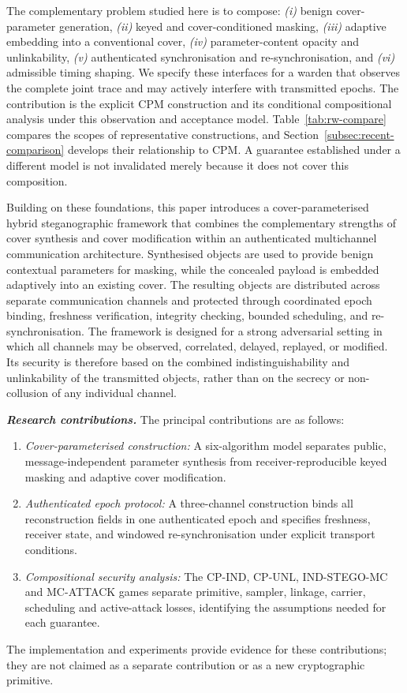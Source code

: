 \documentclass[pdflatex,sn-mathphys-num]{sn-jnl}%
\theoremstyle{definition}
\theoremstyle{game}
\theoremstyle{thmstyleone}%
\theoremstyle{thmstyletwo}%
\theoremstyle{thmstylethree}%
\begin{document}
The complementary problem studied here is to compose:
\emph{(i)} benign cover-parameter generation,
\emph{(ii)} keyed and cover-conditioned masking,
\emph{(iii)} adaptive embedding into a conventional cover,
\emph{(iv)} parameter-content opacity and unlinkability,
\emph{(v)} authenticated synchronisation and re-synchronisation, and
\emph{(vi)} admissible timing shaping.
We specify these interfaces for a warden that observes the complete joint
trace and may actively interfere with transmitted epochs. The contribution
is the explicit CPM construction and its conditional compositional
analysis under this observation and acceptance model.
Table~\ref{tab:rw-compare} compares the scopes of representative
constructions, and Section~\ref{subsec:recent-comparison} develops their
relationship to CPM. A guarantee established under a different model is
not invalidated merely because it does not cover this composition.

Building on these foundations, this paper introduces a cover-parameterised hybrid steganographic framework that combines the complementary strengths of cover synthesis and cover modification within an authenticated multichannel communication architecture. Synthesised objects are used to provide benign contextual parameters for masking, while the concealed payload is embedded adaptively into an existing cover. The resulting objects are distributed across separate communication channels and protected through coordinated epoch binding, freshness verification, integrity checking, bounded
scheduling, and re-synchronisation. The framework is designed for a strong adversarial setting in which all channels may be observed, correlated, delayed, replayed, or modified. Its security is therefore
based on the combined indistinguishability and unlinkability of the transmitted objects, rather than on the secrecy or non-collusion of
any individual channel.

\par
\noindent\textbf{\textit{Research contributions.}}
The principal contributions are as follows:
\begin{enumerate}
    \item \emph{Cover-parameterised construction:} A six-algorithm model separates public, message-independent parameter synthesis from receiver-reproducible keyed masking and adaptive cover modification.
    \item \emph{Authenticated epoch protocol:} A three-channel construction binds all reconstruction fields in one authenticated epoch and specifies freshness, receiver state, and windowed re-synchronisation under explicit transport conditions.
    \item \emph{Compositional security analysis:} The CP-IND, CP-UNL, IND-STEGO-MC and MC-ATTACK games separate primitive, sampler, linkage, carrier, scheduling and active-attack losses, identifying the assumptions needed for each guarantee.
\end{enumerate}
The implementation and experiments provide evidence for these contributions;
they are not claimed as a separate contribution or as a new cryptographic
primitive.
\end{document}
